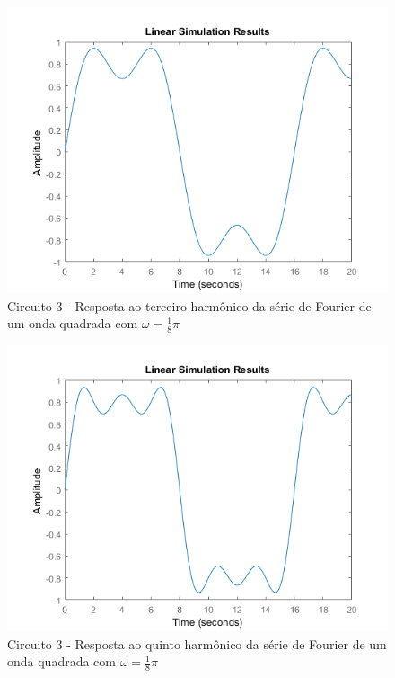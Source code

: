 \documentclass[a4paper, 12pt]{article}
\begin{document}
			\begin{figure}[!ht]
				\centering
				\includegraphics[scale=0.71]{img/1k_circ3.png}
				\caption{Circuito 3 - Resposta ao terceiro harmônico da série de Fourier de um onda quadrada com $\omega = \frac{1}{8}\pi$}	
			\end{figure}			
			\begin{figure}[!ht]
				\centering
				\includegraphics[scale=0.71]{img/1l_circ3.png}
				\caption{Circuito 3 - Resposta ao quinto harmônico da série de Fourier de um onda quadrada com $\omega = \frac{1}{8}\pi$}	
			\end{figure}		
			\clearpage
\end{document}
